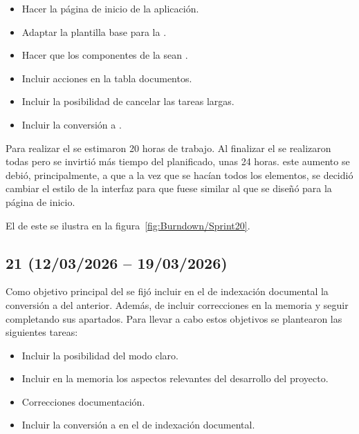 \begin{itemize}
\tightlist
	\item Hacer la página de inicio de la aplicación.
	\item Adaptar la plantilla base para la .
	\item Hacer que los componentes de la  sean .
	\item Incluir acciones en la tabla documentos.
	\item Incluir la posibilidad de cancelar las tareas largas.
	\item Incluir la conversión a .
\end{itemize}

Para realizar el  se estimaron 20 horas de trabajo. Al finalizar el  se realizaron todas pero se invirtió más tiempo del planificado, unas 24 horas. este aumento se debió, principalmente, a que a la vez que se hacían  todos los elementos, se decidió cambiar el estilo de la interfaz  para que fuese similar al que se diseñó para la página de inicio.  

El  de este  se ilustra en la figura~\ref{fig:Burndown/Sprint20}.

\subsection{ 21 (12/03/2026 -- 19/03/2026)}
Como objetivo principal del  se fijó incluir en el  de indexación documental la conversión a  del  anterior. Además, de incluir correcciones en la memoria y seguir completando sus apartados. Para llevar a cabo estos objetivos se plantearon las siguientes tareas:
 
\begin{itemize}
\tightlist
	\item Incluir la posibilidad del modo claro.
	\item Incluir en la memoria los aspectos relevantes del desarrollo del proyecto.
	\item Correcciones documentación.
	\item Incluir la conversión a  en el  de indexación documental.
\end{itemize}

